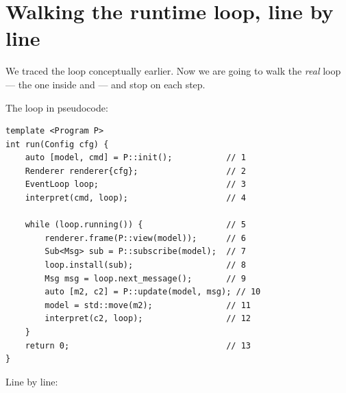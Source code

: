 \section{Walking the runtime loop, line by line}

We traced the loop conceptually earlier. Now we are going to walk
the \emph{real} loop --- the one inside
 and
 --- and stop on each step.

The loop in pseudocode:

\begin{lstlisting}
template <Program P>
int run(Config cfg) {
    auto [model, cmd] = P::init();           // 1
    Renderer renderer{cfg};                  // 2
    EventLoop loop;                          // 3
    interpret(cmd, loop);                    // 4

    while (loop.running()) {                 // 5
        renderer.frame(P::view(model));      // 6
        Sub<Msg> sub = P::subscribe(model);  // 7
        loop.install(sub);                   // 8
        Msg msg = loop.next_message();       // 9
        auto [m2, c2] = P::update(model, msg); // 10
        model = std::move(m2);               // 11
        interpret(c2, loop);                 // 12
    }
    return 0;                                // 13
}
\end{lstlisting}

Line by line:

